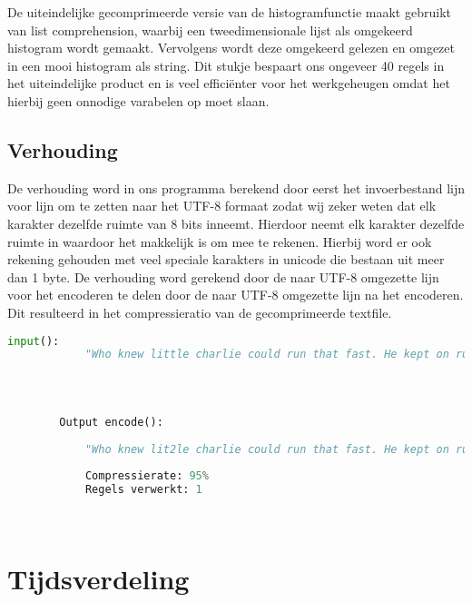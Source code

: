 \documentclass{article}
\begin{document}
      De uiteindelijke gecomprimeerde versie van de histogramfunctie maakt
			gebruikt van list comprehension, waarbij een tweedimensionale lijst
			als omgekeerd histogram wordt gemaakt. Vervolgens wordt deze omgekeerd
			gelezen en omgezet in een mooi histogram als string.
			Dit stukje bespaart ons ongeveer 40 regels in het uiteindelijke product
			en is veel effici\"enter voor het werkgeheugen omdat het hierbij geen
			onnodige varabelen op moet slaan. 
    

    
    \subsection{Verhouding}
        De verhouding word in ons programma berekend door eerst het invoerbestand lijn voor lijn om te zetten naar het UTF-8 formaat zodat wij zeker weten dat elk karakter dezelfde ruimte van 8 bits inneemt. Hierdoor neemt elk karakter dezelfde ruimte in waardoor het makkelijk is om mee te rekenen. Hierbij word er ook rekening gehouden met veel speciale karakters in unicode die bestaan uit meer dan 1 byte. De verhouding word gerekend door de  naar UTF-8 omgezette lijn voor het encoderen te delen door de naar UTF-8 omgezette lijn na het encoderen. Dit resulteerd in het compressieratio van de gecomprimeerde textfile. 
        \newpage
        \begin{lstlisting}[frame=single, language=python]  % Start your code-block
        input():
            "Who knew little charlie could run that fast. He kept on running faster fasteer and fasteeeeeerr !"
            
            
        
        
        Output encode():    
            
            "Who knew lit2le charlie could run that fast. He kept on run2ing faster faste2r and faste6r2 !"
                
            Compressierate: 95%
            Regels verwerkt: 1

            
        \end{lstlisting}

\section{Tijdsverdeling}
\end{document}
